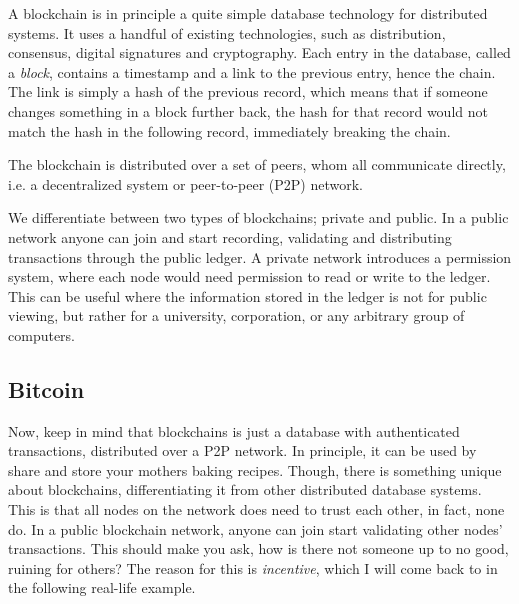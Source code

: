 


A blockchain is in principle a quite simple database technology for
distributed systems. It uses a handful of existing technologies, such
as distribution, consensus, digital signatures and cryptography.  Each
entry in the database, called a \textit{block}, contains a timestamp
and a link to the previous entry, hence the chain. The link is simply a
hash of the previous record, which means that if someone changes
something in a block further back, the hash for that record would not
match the hash in the following record, immediately breaking the
chain.

The blockchain is distributed over a set of peers, whom all communicate
directly, i.e. a decentralized system or peer-to-peer (P2P) network.


We differentiate between two types of blockchains; private and
public. In a public network anyone can join and start recording,
validating and distributing transactions through the public
ledger. A private network introduces a permission system, where each
node would need permission to read or write to the ledger. This can be
useful where the information stored in the ledger is not for public
viewing, but rather for a university, corporation, or any arbitrary
group of computers.


\subsection{Bitcoin}
Now, keep in mind that blockchains is just a database with
authenticated transactions, distributed over a P2P network. In
principle, it can be used by share and store your mothers baking
recipes. Though, there is something unique about blockchains,
differentiating it from other distributed database systems. This is
that all nodes on the network does need to trust each other, in fact,
none do. In a public blockchain network, anyone can join start
validating other nodes' transactions. This should make you ask, how is
there not someone up to no good, ruining for others? The reason for
this is \textit{incentive}, which I will come back to in the following
real-life example.

